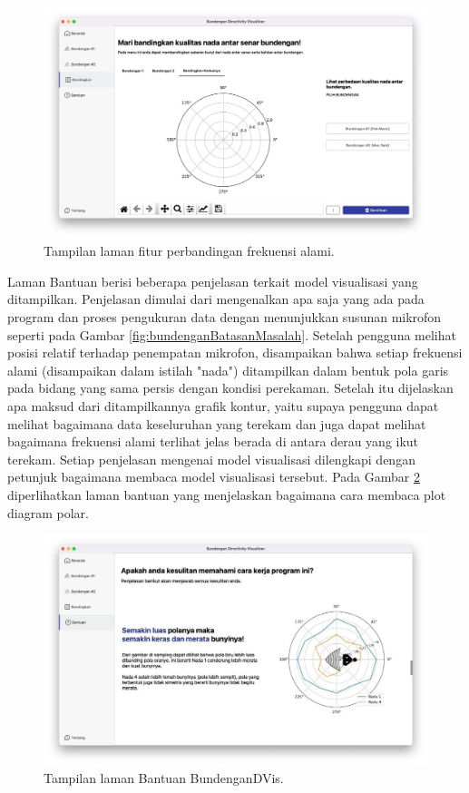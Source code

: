 \begin{figure}[h!]
	\centering
	\includegraphics[width=14cm]{Gambar/laman-bandingkan.jpg}
	\caption{Tampilan laman fitur perbandingan frekuensi alami.}
	\label{fig:compare-app}
\end{figure}

Laman Bantuan berisi beberapa penjelasan terkait model visualisasi yang ditampilkan. Penjelasan dimulai dari mengenalkan \bundengan apa saja yang ada pada program dan proses pengukuran data dengan menunjukkan susunan mikrofon seperti pada Gambar \ref{fig:bundenganBatasanMasalah}. Setelah pengguna melihat posisi \bundengan relatif terhadap penempatan mikrofon, disampaikan bahwa setiap frekuensi alami (disampaikan dalam istilah "nada") ditampilkan dalam bentuk pola garis pada bidang yang sama persis dengan kondisi perekaman. Setelah itu dijelaskan apa maksud dari ditampilkannya grafik kontur, yaitu supaya pengguna dapat melihat bagaimana data keseluruhan yang terekam dan juga dapat melihat bagaimana frekuensi alami \bundengan terlihat jelas berada di antara derau yang ikut terekam. Setiap penjelasan mengenai model visualisasi dilengkapi dengan petunjuk bagaimana membaca model visualisasi tersebut. Pada Gambar \ref{fig:help-app} diperlihatkan laman bantuan yang menjelaskan bagaimana cara membaca plot diagram polar. \par 

\begin{figure}[t!]
	\centering
	\includegraphics[width=13cm]{Gambar/laman-help.jpg}
	\caption{Tampilan laman Bantuan BundenganDVis.}
	\label{fig:help-app}
\end{figure}

